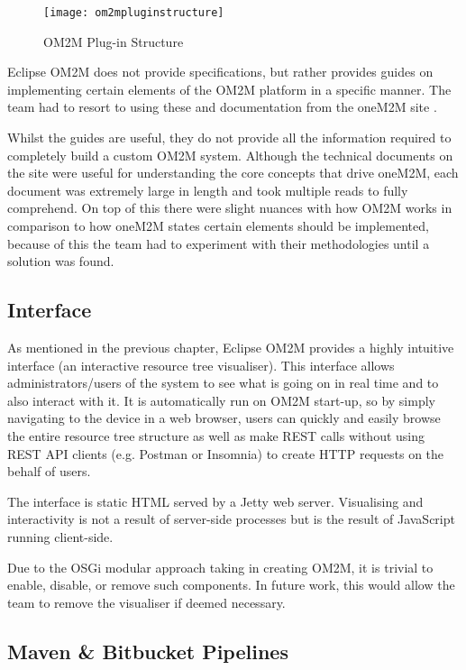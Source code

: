\begin{figure}[H]
  \centering
  \texttt{[image: om2mpluginstructure]}
  \caption{OM2M Plug-in Structure}
  \label{om2mpluginstruct}
\end{figure}

Eclipse OM2M does not provide specifications, but rather provides guides on implementing certain elements of the OM2M platform in a specific manner. The team had to resort to using these and documentation from the oneM2M site \cite{onem2mhome}.

Whilst the guides are useful, they do not provide all the information required to completely build a custom OM2M system. Although the technical documents on the site were useful for understanding the core concepts that drive oneM2M, each document was extremely large in length and took multiple reads to fully comprehend. On top of this there were slight nuances with how OM2M works in comparison to how oneM2M states certain elements should be implemented, because of this the team had to experiment with their methodologies until a solution was found.

\subsection{Interface}

As mentioned in the previous chapter, Eclipse OM2M provides a highly intuitive interface (an interactive resource tree visualiser). This interface allows administrators/users of the system to see what is going on in real time and to also interact with it. It is automatically run on OM2M start-up, so by simply navigating to the device in a web browser, users can quickly and easily browse the entire resource tree structure as well as make REST calls without using REST API clients (e.g. Postman or Insomnia) to create HTTP requests on the behalf of users.

The interface is static HTML served by a Jetty web server. Visualising and interactivity is not a result of server-side processes but is the result of JavaScript running client-side.

Due to the OSGi modular approach taking in creating OM2M, it is trivial to enable, disable, or remove such components. In future work, this would allow the team to remove the visualiser if deemed necessary.
 
\subsection{Maven \& Bitbucket Pipelines}


